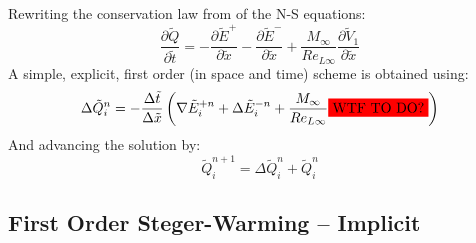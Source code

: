 \documentclass[11pt, a4paper]{article}
\newcommand{\parder}[2]{\frac{\partial {#1}}{\partial {#2}}}
\begin{document}
Rewriting the conservation law from of the N-S equations:
\begin{equation}
    \parder{\tilde{Q}}{\tilde{t}}=-\parder{\tilde{E}^+}{\tilde{x}}-\parder{\tilde{E}^-}{\tilde{x}}+\frac{M_\infty}{Re_{L\infty}}\parder{\tilde{V}_1}{\tilde{x}}
\end{equation}
A simple, explicit, first order (in space and time) scheme is obtained using:
\begin{equation}
    \Delta\tilde{Q}_i^n=-\frac{\Delta\tilde{t}}{\Delta\tilde{x}}\left(\nabla\tilde{E}_i^{+n}+\Delta\tilde{E}_i^{-n}+\frac{M_\infty}{Re_{L\infty}}\colorbox{red}{WTF TO DO?}\right)
\end{equation}
And advancing the solution by:
\begin{equation}
    \tilde{Q}_i^{n+1}=\Delta\tilde{Q}_i^n+\tilde{Q}_i^n
\end{equation} 

\subsection{First Order Steger-Warming -- Implicit}
\end{document}
